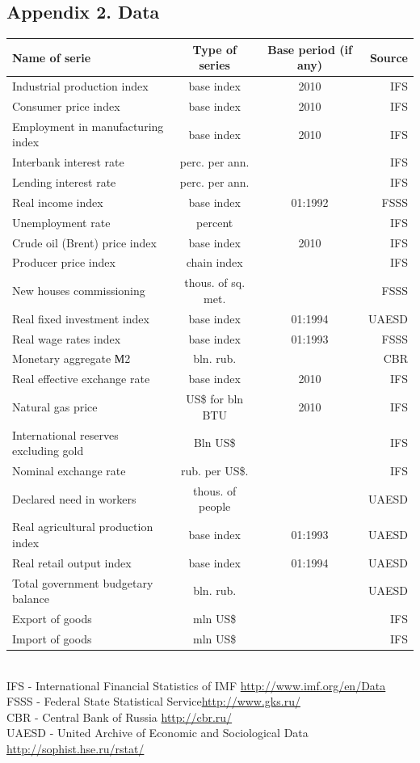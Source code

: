 \documentclass[12pt]{article} %
\begin{document}
\subsection*{Appendix 2. Data}
\begin{center}
\begin{table}[h!]
\begin{tabular}{lccr}
\toprule
Name of serie& Type of series &  Base period (if any) & Source \\
\midrule
Industrial production index & base index & 2010 & IFS \\
Consumer price index & base index  & 2010 & IFS \\
Employment in manufacturing index & base index  & 2010 & IFS \\
Interbank interest rate & perc. per ann. &  & IFS \\
Lending interest rate & perc. per ann.&  & IFS \\
Real income index & base index  & 01:1992 & FSSS\\
Unemployment rate & percent &  & IFS \\
Crude oil (Brent) price index & base index  & 2010 & IFS \\
Producer price index & chain index &  & IFS \\
New houses commissioning & thous. of sq. met. &  & FSSS\\
Real fixed investment  index & base index  & 01:1994 & UAESD\\
Real wage rates index & base index  & 01:1993 & FSSS \\
Monetary aggregate М2 & bln. rub.  &  & CBR \\
Real effective exchange rate & base index  & 2010 & IFS \\
Natural gas price & US\$ for bln BTU & 2010 & IFS \\
International reserves excluding gold & Bln US\$ &  & IFS \\
Nominal exchange rate & rub. per US\$. &  & IFS \\
Declared need in workers  & thous. of people &  & UAESD \\
Real agricultural production index & base index  & 01:1993 & UAESD\\
Real retail output index & base index  & 01:1994 & UAESD\\
Total government budgetary balance & bln. rub. &  & UAESD \\
Export of goods & mln US\$ &  & IFS \\
Import of goods &  mln US\$ &  & IFS \\
\bottomrule
\end{tabular}
\vspace{5mm}\\
IFS - International Financial Statistics of IMF \url{http://www.imf.org/en/Data}\\
FSSS - Federal State Statistical Service\url{http://www.gks.ru/}\\
CBR - Central Bank of Russia \url{http://cbr.ru/}\\
UAESD - United Archive of Economic and Sociological Data \url{http://sophist.hse.ru/rstat/}
\end{table}
\end{center}



\end{document}
